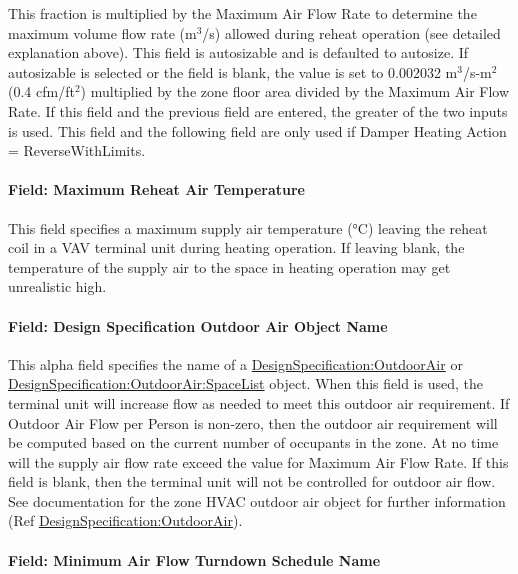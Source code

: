 This fraction is multiplied by the Maximum Air Flow Rate to determine the maximum volume flow rate (m\(^{3}\)/s) allowed during reheat operation (see detailed explanation above). This field is autosizable and is defaulted to autosize. If autosizable is selected or the field is blank, the value is set to 0.002032 m\(^{3}\)/s-m\(^{2}\) (0.4 cfm/ft\(^{2}\)) multiplied by the zone floor area divided by the Maximum Air Flow Rate. If this field and the previous field are entered, the greater of the two inputs is used. This field and the following field are only used if Damper Heating Action = ReverseWithLimits.

\paragraph{Field: Maximum Reheat Air Temperature}\label{field-maximum-reheat-air-temperature-1}

This field specifies a maximum supply air temperature (°C) leaving the reheat coil in a VAV terminal unit during heating operation. If leaving blank, the temperature of the supply air to the space in heating operation may get unrealistic high.

\paragraph{Field: Design Specification Outdoor Air Object Name}\label{field-design-specification-outdoor-air-object-name}

This alpha field specifies the name of a \hyperref[designspecificationoutdoorair]{DesignSpecification:OutdoorAir} or \hyperref[designspecificationoutdoorairspacelist]{DesignSpecification:OutdoorAir:SpaceList} object. When this field is used, the terminal unit will increase flow as needed to meet this outdoor air requirement. If Outdoor Air Flow per Person is non-zero, then the outdoor air requirement will be computed based on the current number of occupants in the zone. At no time will the supply air flow rate exceed the value for Maximum Air Flow Rate. If this field is blank, then the terminal unit will not be controlled for outdoor air flow. See documentation for the zone HVAC outdoor air object for further information (Ref \hyperref[designspecificationoutdoorair]{DesignSpecification:OutdoorAir}).

\paragraph{Field: Minimum Air Flow Turndown Schedule Name}

